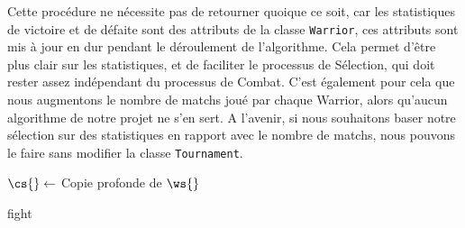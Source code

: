\documentclass[hidelinks]{report}
\begin{document}
Cette procédure ne nécessite pas de retourner quoique ce soit, car les statistiques de victoire et de défaite sont des attributs de la classe \texttt{Warrior}, ces attributs sont mis à jour en dur pendant le déroulement de l'algorithme. Cela permet d'être plus clair sur les statistiques, et de faciliter le processus de Sélection, qui doit rester assez indépendant du processus de Combat. C'est également pour cela que nous augmentons le nombre de matchs joué par chaque Warrior, alors qu'aucun algorithme de notre projet ne s'en sert. A l'avenir, si nous souhaitons baser notre sélection sur des statistiques en rapport avec le nombre de matchs, nous pouvons le faire sans modifier la classe \texttt{Tournament}.
\LinesNumbered
\begin{algorithm}[H]
\DontPrintSemicolon
{}

$\cs{} \gets$ Copie profonde de $\ws{}$\;
\caption{\sc fight}
\label{algo:fight}
\end{algorithm}
\end{document}

